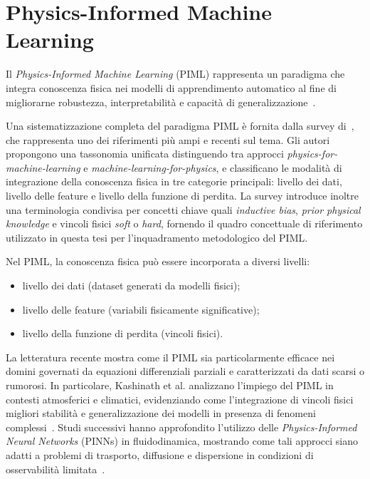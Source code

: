 \section{Physics-Informed Machine Learning}
\label{sec:piml}

Il \emph{Physics-Informed Machine Learning} (PIML) rappresenta un paradigma che integra conoscenza fisica nei modelli di apprendimento automatico al fine di migliorarne robustezza, interpretabilità e capacità di generalizzazione~\cite{karniadakis_piml, meng_piml}.

Una sistematizzazione completa del paradigma PIML è fornita dalla survey di~\cite{meng2025piml}, che rappresenta uno dei riferimenti più ampi e recenti sul tema. Gli autori propongono una tassonomia unificata distinguendo tra approcci \emph{physics-for-machine-learning} e \emph{machine-learning-for-physics}, e classificano le modalità di integrazione della conoscenza fisica in tre categorie principali: livello dei dati, livello delle feature e livello della funzione di perdita. La survey introduce inoltre una terminologia condivisa per concetti chiave quali \emph{inductive bias}, \emph{prior physical knowledge} e vincoli fisici \emph{soft} o \emph{hard}, fornendo il quadro concettuale di riferimento utilizzato in questa tesi per l’inquadramento metodologico del PIML.

Nel PIML, la conoscenza fisica può essere incorporata a diversi livelli:
\begin{itemize}
	\item livello dei dati (dataset generati da modelli fisici);
	\item livello delle feature (variabili fisicamente significative);
	\item livello della funzione di perdita (vincoli fisici).
\end{itemize}

La letteratura recente mostra come il PIML sia particolarmente efficace nei domini governati da equazioni differenziali parziali e caratterizzati da dati scarsi o rumorosi.
In particolare, Kashinath et al. analizzano l’impiego del PIML in contesti atmosferici e climatici, evidenziando come l’integrazione di vincoli fisici migliori stabilità e generalizzazione dei modelli in presenza di fenomeni complessi~\cite{kashinath2021piml}.
Studi successivi hanno approfondito l’utilizzo delle \emph{Physics-Informed Neural Networks} (PINNs) in fluidodinamica, mostrando come tali approcci siano adatti a problemi di trasporto, diffusione e dispersione in condizioni di osservabilità limitata~\cite{elhassan2025pinnsparse}.

